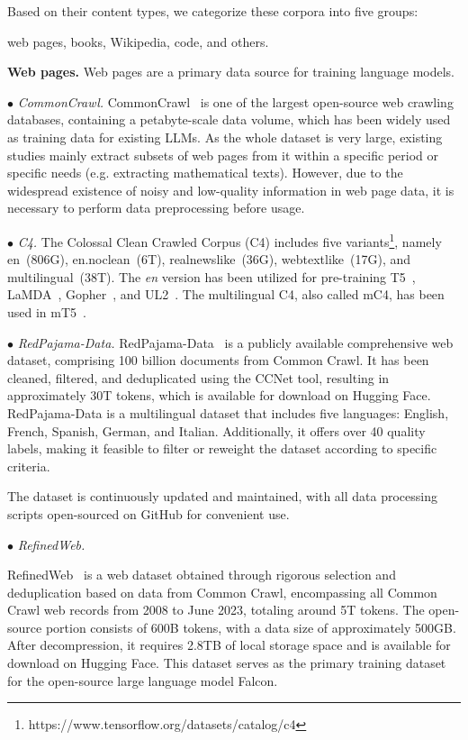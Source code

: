 Based on their content types, we categorize these corpora into five groups: 

{web pages, books, Wikipedia, code, and others.}

\textbf{Web pages.} Web pages are a primary data source for training language models. 

$\bullet$ \textit{CommonCrawl.} CommonCrawl~\cite{commoncrawl} is one of the largest open-source web crawling databases, containing a petabyte-scale data volume, which has been widely used as training data for existing LLMs. As the whole dataset is very large, existing studies mainly extract subsets of web pages from it within a specific period or specific needs (e.g. extracting mathematical texts). However, due to the widespread existence of noisy and low-quality information in web page data, it is necessary to perform data preprocessing before usage.

$\bullet$ \textit{C4.} {The Colossal Clean Crawled Corpus (C4) includes five {variants}\footnote{https://www.tensorflow.org/datasets/catalog/c4 }, namely en~(806G), en.noclean~(6T), realnewslike~(36G), webtextlike~(17G), and multilingual~(38T). The \emph{en} version has been utilized for pre-training T5~\cite{Raffel-JMLR-2020-Exploring}, LaMDA~\cite{Thoppilan-CoRR-2022-LaMDA}, Gopher~\cite{Rae-arxiv-2021-Scaling}, and UL2~\cite{Tay-arxiv-2022-UL2}. The multilingual C4, also called mC4, has been used in mT5~\cite{Xue-NAACL-2021-mT5}.}

$\bullet$ \textit{RedPajama-Data.} {RedPajama-Data~\cite{Together-2023-Redpajama}} is a publicly available comprehensive web dataset, comprising 100 billion documents from Common Crawl. It has been cleaned, filtered, and deduplicated using the CCNet tool, resulting in approximately 30T tokens, which is available for download on Hugging Face. RedPajama-Data is a multilingual dataset that includes five languages: English, French, Spanish, German, and Italian. Additionally, it offers over 40 quality labels, making it feasible to filter or reweight the dataset according to specific criteria. 

The dataset is continuously updated and maintained, with all data processing scripts open-sourced on GitHub for  convenient use.

$\bullet$ \textit{RefinedWeb.} 

{RefinedWeb~\cite{Penedo-2023-arxiv-Refinedweb}} is a web dataset obtained through rigorous selection and deduplication based on data from Common Crawl, encompassing all Common Crawl web records from 2008 to June 2023, totaling around 5T tokens. The open-source portion consists of 600B tokens, with a data size of approximately 500GB. After decompression, it requires 2.8TB of local storage space and is available for download on Hugging Face. This dataset serves as the primary training dataset for the open-source large language model Falcon.

